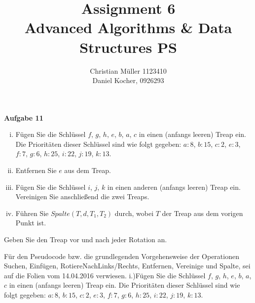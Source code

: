 \documentclass{article}
\begin{document}
\title{Assignment 6 \\ Advanced Algorithms \& Data Structures PS}%
\author{Christian Müller 1123410 \\ Daniel Kocher, 0926293}%
\maketitle

{\bfseries Aufgabe 11}%
{\parskip0pt
  \begin{enumerate}[i.)]
  \item F{\"u}gen Sie die Schl{\"u}ssel $f$, $g$, $h$, $e$, $b$, $a$, $c$ in einen
    (anfangs leeren) Treap ein. Die Priorit{\"a}ten dieser Schl{\"u}ssel sind
    wie folgt gegeben: $a:8$, $b:15$, $c:2$, $e:3$, $f:7$, $g:6$, $h:25$, $i:22$,
    $j:19$, $k:13$.
  \item Entfernen Sie $e$ aus dem Treap.
  \item F{\"u}gen Sie die Schl{\"u}ssel $i$, $j$, $k$ in einen anderen (anfangs
    leeren) Treap ein. Vereinigen Sie anschlie{\ss}end die zwei Treaps.
  \item F{\"u}hren Sie $Spalte \left( T, d, T_1, T_2 \right)$ durch, wobei $T$
    der Treap aus dem vorigen Punkt ist.
  \end{enumerate}
}
Geben Sie den Treap vor und nach jeder Rotation an.

\medskip%

F{\"u}r den Pseudocode bzw. die grundlegenden Vorgehensweise der Operationen
Suchen, Einf{\"u}gen, RotiereNachLinks/Rechts, Entfernen, Vereinige und Spalte,
sei auf die Folien vom 14.04.2016 verwiesen.
\newpage
i.)F{\"u}gen Sie die Schl{\"u}ssel $f$, $g$, $h$, $e$, $b$, $a$, $c$ in einen
    (anfangs leeren) Treap ein. Die Priorit{\"a}ten dieser Schl{\"u}ssel sind
    wie folgt gegeben: $a:8$, $b:15$, $c:2$, $e:3$, $f:7$, $g:6$, $h:25$, $i:22$,
    $j:19$, $k:13$.\\
    
\end{document}
